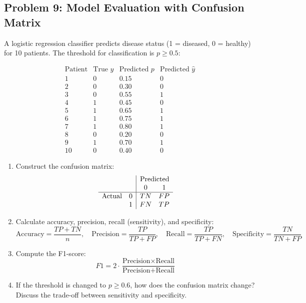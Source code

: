 \documentclass[12pt]{article}
\begin{document}
\subsection*{Problem 9: Model Evaluation with Confusion Matrix}

A logistic regression classifier predicts disease status (1 = diseased, 0 = healthy) for 10 patients. The threshold for classification is \(p \geq 0.5\):

\[
\begin{array}{c|c|c|c}
\text{Patient} & \text{True } y & \text{Predicted } p & \text{Predicted } \hat{y} \\
\hline
1 & 0 & 0.15 & 0 \\
2 & 0 & 0.30 & 0 \\
3 & 0 & 0.55 & 1 \\
4 & 1 & 0.45 & 0 \\
5 & 1 & 0.65 & 1 \\
6 & 1 & 0.75 & 1 \\
7 & 1 & 0.80 & 1 \\
8 & 0 & 0.20 & 0 \\
9 & 1 & 0.70 & 1 \\
10 & 0 & 0.40 & 0
\end{array}
\]

\begin{enumerate}[label=(\alph*)]
\item Construct the confusion matrix:
\[
\begin{array}{cc|cc}
 & & \multicolumn{2}{c}{\text{Predicted}} \\
 & & 0 & 1 \\
\hline
\text{Actual} & 0 & TN & FP \\
 & 1 & FN & TP
\end{array}
\]

\item Calculate accuracy, precision, recall (sensitivity), and specificity:
\[
\text{Accuracy} = \frac{TP + TN}{n}, \quad \text{Precision} = \frac{TP}{TP + FP}, \quad \text{Recall} = \frac{TP}{TP + FN}, \quad \text{Specificity} = \frac{TN}{TN + FP}
\]

\item Compute the F1-score:
\[
F1 = 2 \cdot \frac{\text{Precision} \times \text{Recall}}{\text{Precision} + \text{Recall}}
\]

\item If the threshold is changed to \(p \geq 0.6\), how does the confusion matrix change? Discuss the trade-off between sensitivity and specificity.
\end{enumerate}
\end{document}
